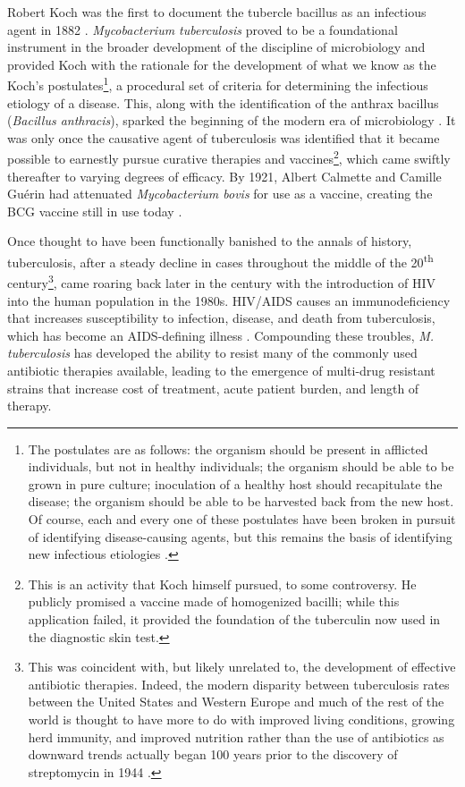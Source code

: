 Robert Koch was the first to document the tubercle bacillus as an infectious agent in 1882 \citep{Koch1882}. \textit{Mycobacterium tuberculosis} proved to be a foundational instrument in the broader development of the discipline of microbiology and provided Koch with the rationale for the development of what we know as the Koch's postulates\footnote{The postulates are as follows: the organism should be present in afflicted individuals, but not in healthy individuals; the organism should be able to be grown in pure culture; inoculation of a healthy host should recapitulate the disease; the organism should be able to be harvested back from the new host. Of course, each and every one of these postulates have been broken in pursuit of identifying disease-causing agents, but this remains the basis of identifying new infectious etiologies \citep{Segre2013}.}, a procedural set of criteria for determining the infectious etiology of a disease. This, along with the identification of the anthrax bacillus (\textit{Bacillus anthracis}), sparked the beginning of the modern era of microbiology \citep{Koch1876}. It was only once the causative agent of tuberculosis was identified that it became possible to earnestly pursue curative therapies and vaccines\footnote{This is an activity that Koch himself pursued, to some controversy. He publicly promised a vaccine made of homogenized bacilli; while this application failed, it provided the foundation of the tuberculin now used in the diagnostic skin test.}, which came swiftly thereafter to varying degrees of efficacy. By 1921, Albert Calmette and Camille Gu\'{e}rin had attenuated \textit{Mycobacterium bovis} for use as a vaccine, creating the BCG vaccine still in use today \citep{Hawgood2007}. 

Once thought to have been functionally banished to the annals of history, tuberculosis, after a steady decline in cases throughout the middle of the 20\textsuperscript{th} century\footnote{This was coincident with, but likely unrelated to, the development of effective antibiotic therapies. Indeed, the modern disparity between tuberculosis rates between the United States and Western Europe and much of the rest of the world is thought to have more to do with improved living conditions, growing herd immunity, and improved nutrition rather than the use of antibiotics as downward trends actually began 100 years prior to the discovery of streptomycin in 1944 \citep{Lowbury1958}.}, came roaring back later in the century with the introduction of HIV into the human population in the 1980s. HIV/AIDS causes an immunodeficiency that increases susceptibility to infection, disease, and death from tuberculosis, which has become an AIDS-defining illness \citep{Drobniewski1995}. Compounding these troubles, \textit{M. tuberculosis} has developed the ability to resist many of the commonly used antibiotic therapies available, leading to the emergence of multi-drug resistant strains that increase cost of treatment, acute patient burden, and length of therapy.

